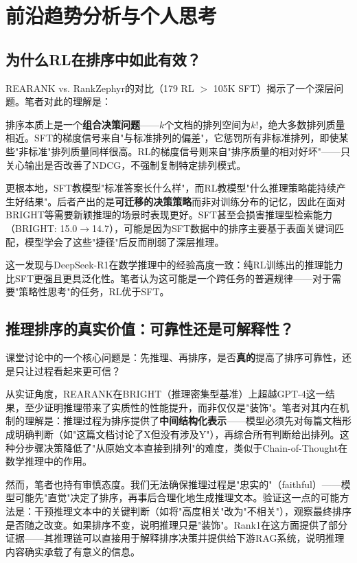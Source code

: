 \documentclass[12pt,a4paper]{article}
\begin{document}
\section{前沿趋势分析与个人思考}

\subsection{为什么RL在排序中如此有效？}

REARANK vs. RankZephyr的对比（179 RL $>$ 105K SFT）揭示了一个深层问题。笔者对此的理解是：

排序本质上是一个\textbf{组合决策问题}——$k$个文档的排列空间为$k!$，绝大多数排列质量相近。SFT的梯度信号来自"与标准排列的偏差"，它惩罚所有非标准排列，即使某些"非标准"排列质量同样很高。RL的梯度信号则来自"排序质量的相对好坏"——只关心输出是否改善了NDCG，不强制复制特定排列模式。

更根本地，SFT教模型"标准答案长什么样"，而RL教模型"什么推理策略能持续产生好结果"。后者产出的是\textbf{可迁移的决策策略}而非对训练分布的记忆，因此在面对BRIGHT等需要新颖推理的场景时表现更好。SFT甚至会损害推理型检索能力（BRIGHT: 15.0$\to$14.7），可能是因为SFT数据中的排序主要基于表面关键词匹配，模型学会了这些"捷径"后反而削弱了深层推理。

这一发现与DeepSeek-R1\cite{deepseek2025r1}在数学推理中的经验高度一致：纯RL训练出的推理能力比SFT更强且更具泛化性。笔者认为这可能是一个跨任务的普遍规律——对于需要"策略性思考"的任务，RL优于SFT。

\subsection{推理排序的真实价值：可靠性还是可解释性？}

课堂讨论中的一个核心问题是：先推理、再排序，是否\textbf{真的}提高了排序可靠性，还是只让过程看起来更可信？

从实证角度，REARANK在BRIGHT（推理密集型基准）上超越GPT-4这一结果，至少证明推理带来了实质性的性能提升，而非仅仅是"装饰"。笔者对其内在机制的理解是：推理过程为排序提供了\textbf{中间结构化表示}——模型必须先对每篇文档形成明确判断（如"这篇文档讨论了X但没有涉及Y"），再综合所有判断给出排列。这种分步骤决策降低了"从原始文本直接到排列"的难度，类似于Chain-of-Thought\cite{wei2022chain}在数学推理中的作用。

然而，笔者也持有审慎态度。我们无法确保推理过程是"忠实的"（faithful）——模型可能先"直觉"决定了排序，再事后合理化地生成推理文本。验证这一点的可能方法是：干预推理文本中的关键判断（如将"高度相关"改为"不相关"），观察最终排序是否随之改变。如果排序不变，说明推理只是"装饰"。Rank1\cite{weller2025rank1}在这方面提供了部分证据——其推理链可以直接用于解释排序决策并提供给下游RAG系统，说明推理内容确实承载了有意义的信息。
\end{document}
